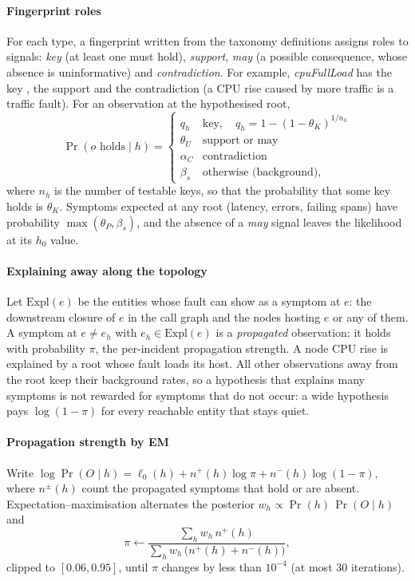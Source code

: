 \paragraph{Fingerprint roles}
For each type, a fingerprint written from the taxonomy definitions assigns roles to signals: \emph{key} (at least one must hold),
\emph{support}, \emph{may} (a possible consequence, whose absence is uninformative) and \emph{contradiction}. For example,
\emph{cpuFullLoad} has the key , the support  and the contradiction
 (a CPU rise caused by more traffic is a traffic fault). For an observation at the hypothesised root,
\begin{equation}\label{eq:roles}
\Pr(o\text{ holds}\mid h)=\begin{cases}
q_h & \text{key},\quad q_h=1-(1-\theta_K)^{1/n_h}\\
\theta_U & \text{support or may}\\
\alpha_C & \text{contradiction}\\
\beta_s & \text{otherwise (background)},
\end{cases}
\end{equation}
where $n_h$ is the number of testable keys, so that the probability that some key holds is $\theta_K$. Symptoms expected at any root
(latency, errors, failing spans) have probability $\max(\theta_P,\beta_s)$, and the absence of a \emph{may} signal leaves the
likelihood at its $h_0$ value.

\paragraph{Explaining away along the topology}
Let $\mathrm{Expl}(e)$ be the entities whose fault can show as a symptom at $e$: the downstream closure of $e$ in the call graph and
the nodes hosting $e$ or any of them. A symptom at $e\neq e_h$ with $e_h\in\mathrm{Expl}(e)$ is a \emph{propagated} observation:
it holds with probability $\pi$, the per-incident propagation strength. A node CPU rise is explained by a root whose fault loads its
host. All other observations away from the root keep their background rates, so a hypothesis that explains many symptoms is not
rewarded for symptoms that do not occur: a wide hypothesis pays $\log(1-\pi)$ for every reachable entity that stays quiet.

\paragraph{Propagation strength by EM}
Write $\log\Pr(O\mid h)=\ell_0(h)+n^{+}(h)\log\pi+n^{-}(h)\log(1-\pi)$, where $n^{\pm}(h)$ count the propagated symptoms that hold or
are absent. Expectation--maximisation \citep{dempster1977em} alternates the posterior $w_h\propto\Pr(h)\,\Pr(O\mid h)$ and
\begin{equation}
\pi\leftarrow\frac{\sum_h w_h\,n^{+}(h)}{\sum_h w_h\,\big(n^{+}(h)+n^{-}(h)\big)},
\end{equation}
clipped to $[0.06,0.95]$, until $\pi$ changes by less than $10^{-4}$ (at most 30 iterations).


